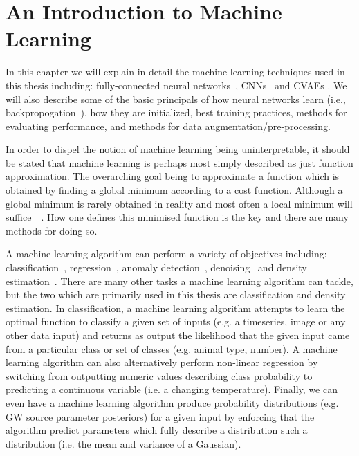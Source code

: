 \chapter{An Introduction to Machine Learning}\label{ch:chap_2}

%
%
In this chapter we will explain in detail the machine learning techniques used in this thesis 
including: fully-connected neural networks~\cite{Goodfellow-et-al-2016}, 
\ac{CNN}s~\cite{NIPS2012_4824} and \ac{CVAE}s \cite{1812.04405}. We will also describe 
some of the basic principals of how neural networks learn 
(i.e., backpropogation~\cite{LeCun1998}), how they are initialized, best training 
practices, methods for evaluating performance, and methods for data 
augmentation/pre-processing.

In order to dispel the notion of machine learning being uninterpretable, it should be 
stated that machine learning is perhaps most simply described as just function approximation.
The overarching goal being to approximate a function which is obtained by finding 
a global minimum according to a cost function. Although a global minimum is rarely 
obtained in reality and most often a local minimum will 
suffice~~. How one defines this 
minimised function is the key and there are many methods for doing so.

A machine learning algorithm can perform a variety of objectives 
including: classification~\cite{1404.7584}, regression~\cite{6909637}, anomaly 
detection~\cite{9243329}, denoising~\cite{1912.13171} and density 
estimation~\cite{1910.13233}. There are many other tasks a machine 
learning algorithm can tackle, but the two which are primarily used in this 
thesis are classification and density estimation. In classification, a machine learning 
algorithm attempts to learn the optimal function to classify a given set of 
inputs (e.g. a timeseries, image or any other data input) and returns as output 
the likelihood that the given input came from a particular class or set of 
classes (e.g. animal type, number). A machine learning algorithm can also alternatively 
perform non-linear regression by switching from outputting numeric values describing 
class probability to predicting a continuous variable (i.e. a changing temperature). 
Finally, we can even have a machine learning algorithm produce probability 
distributions (e.g. \ac{GW} source parameter posteriors) for a given input by 
enforcing that the algorithm predict parameters which fully describe a distribution 
such a distribution (i.e. the mean and variance of a Gaussian).

